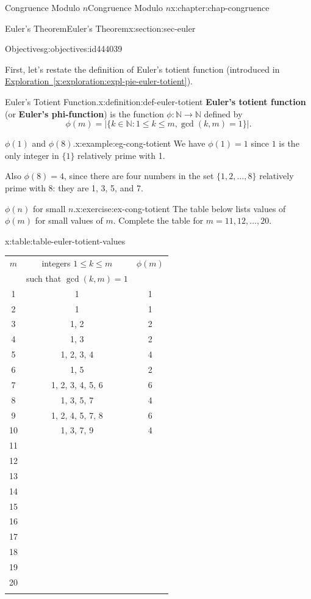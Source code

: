 \documentclass[oneside,10pt,]{book}
\newcommand{\tabularfont}{\relax}
\newcommand{\xreffont}{\relax}
\newcommand{\terminology}[1]{\textbf{#1}}
\numberwithin{equation}{section}
\newcommand{\hrulemedium}{\noalign{\hrule height 0.07em}}
\begin{document}
\begin{chapterptx}{Congruence Modulo \(n\)}{}{Congruence Modulo \(n\)}{}{}{x:chapter:chap-congruence}
\begin{sectionptx}{Euler's Theorem}{}{Euler's Theorem}{}{}{x:section:sec-euler}
\begin{objectives}{Objectives}{g:objectives:id444039}
\begin{itemize}[label=\textbullet]
\end{itemize}
\end{objectives}
First, let's restate the definition of Euler's totient function (introduced in \hyperref[x:exploration:expl-pie-euler-totient]{Exploration~{\xreffont\ref{x:exploration:expl-pie-euler-totient}}}).%
\begin{definition}{Euler's Totient Function.}{x:definition:def-euler-totient}%
\terminology{Euler's totient function} (or \terminology{Euler's phi-function}) is the function \(\phi: \mathbb{N} \rightarrow \mathbb{N}\) defined by%
\begin{equation*}
\phi(m) = \bigl|\{k \in \mathbb{N} : 1 \leq k \leq m, \gcd(k,m) = 1\}\bigr|\text{.}
\end{equation*}
%
\label{g:notation:id221341}%
\end{definition}
\begin{example}{\(\phi(1)\) and \(\phi(8)\).}{x:example:eg-cong-totient}%
We have \(\phi(1) = 1\) since \(1\) is the only integer in \(\{1\}\) relatively prime with 1.%
\par
Also \(\phi(8) = 4\), since there are four numbers in the set \(\{1,2,\ldots,8\}\) relatively prime with 8: they are 1, 3, 5, and 7.%
\end{example}
\begin{inlineexercise}{\(\phi(n)\) for small \(n\).}{x:exercise:ex-cong-totient}%
The table below lists values of \(\phi(m)\) for small values of \(m\). Complete the table for \(m = 11, 12, \ldots, 20\).%
\begin{tableptx}{\textbf{}}{x:table:table-euler-totient-values}{}%
\centering
{\tabularfont%
\begin{tabular}{ccc}
\(m\)&integers \(1 \leq k \leq m\)&\(\phi(m)\)\tabularnewline[0pt]
&such that \(\gcd(k,m)=1\)&\tabularnewline\hrulemedium
1&1&1\tabularnewline[0pt]
2&1&1\tabularnewline[0pt]
3&1, 2&2\tabularnewline[0pt]
4&1, 3&2\tabularnewline[0pt]
5&1, 2, 3, 4&4\tabularnewline\hrulemedium
6&1, 5&2\tabularnewline[0pt]
7&1, 2, 3, 4, 5, 6&6\tabularnewline[0pt]
8&1, 3, 5, 7&4\tabularnewline[0pt]
9&1, 2, 4, 5, 7, 8&6\tabularnewline[0pt]
10&1, 3, 7, 9&4\tabularnewline\hrulemedium
11&&\tabularnewline[0pt]
12&&\tabularnewline[0pt]
13&&\tabularnewline[0pt]
14&&\tabularnewline[0pt]
15&&\tabularnewline\hrulemedium
16&&\tabularnewline[0pt]
17&&\tabularnewline[0pt]
18&&\tabularnewline[0pt]
19&&\tabularnewline[0pt]
20&&\tabularnewline\hrulemedium
\end{tabular}
}%
\end{tableptx}%
\end{inlineexercise}

\end{sectionptx}
\end{chapterptx}
\end{document}
